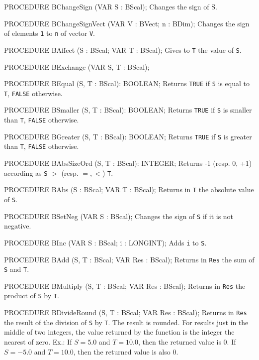 PROCEDURE BChangeSign (VAR S : BScal);
\endcode
  \tab  Changes the sign of S. \endtab
\code

PROCEDURE BChangeSignVect (VAR V : BVect;  n : BDim);
\endcode
  \tab  Changes the sign of elements {\tt 1} to {\tt n} of vector {\tt V}.
  \endtab
\code

PROCEDURE BAffect (S : BScal;  VAR T : BScal);
\endcode
  \tab  Gives to {\tt T} the value of {\tt S}.\endtab
\code

PROCEDURE BExchange (VAR S, T : BScal);

PROCEDURE BEqual (S, T : BScal): BOOLEAN;
\endcode
  \tab  Returns {\tt TRUE} if {\tt S} is equal to {\tt T},
   {\tt FALSE} otherwise.
  \endtab
\code

PROCEDURE BSmaller (S, T : BScal): BOOLEAN;
\endcode
  \tab  Returns {\tt TRUE} if {\tt S} is smaller than {\tt T},
  {\tt FALSE} otherwise.
  \endtab
\code

PROCEDURE BGreater (S, T : BScal): BOOLEAN;
\endcode
  \tab  Returns {\tt TRUE} if {\tt S} is greater than {\tt T},
  {\tt FALSE} otherwise.
  \endtab
\code

PROCEDURE BAbsSizeOrd (S, T : BScal): INTEGER;
\endcode
  \tab  Returns -1 (resp. 0, +1) according as {\tt S} $>$ (resp. $=, <$) {\tt T}. 
  \endtab
\code

PROCEDURE BAbs (S : BScal;  VAR T : BScal);
\endcode
  \tab  Returns in {\tt T} the absolute value of {\tt S}. \endtab
\code

PROCEDURE BSetNeg (VAR S : BScal);
\endcode
  \tab  Changes the sign of {\tt S} if it is not negative.
  \endtab
\code

PROCEDURE BInc (VAR S : BScal; i : LONGINT);
\endcode
  \tab  Adds  {\tt i}  to  {\tt S}.
  \endtab
\code

PROCEDURE BAdd (S, T : BScal;  VAR Res : BScal);
\endcode
  \tab  Returns in {\tt Res} the sum of {\tt S} and {\tt T}.  \endtab
\code

PROCEDURE BMultiply (S, T : BScal;   VAR Res : BScal);
\endcode
  \tab  Returns in {\tt Res} the product of {\tt S} by {\tt T}. \endtab
\code

PROCEDURE BDivideRound (S, T : BScal; VAR Res : BScal);
\endcode
  \tab  Returns in {\tt Res} the result of the division of {\tt S}
        by {\tt T}.  The result is rounded.  For results just in the
        middle of two integers, the value returned by the function is
        the integer the nearest of zero.
        Ex.: If $S=5.0$ and $T=10.0$, then the returned value is 0.
            If $S=-5.0$ and $T=10.0$, then the returned value is also 0.
  \endtab
\code

